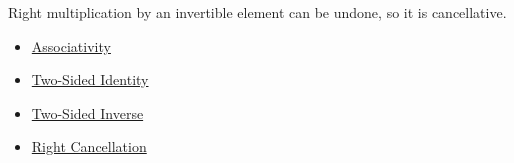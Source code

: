\begin{remark*}[Interpretation]
Right multiplication by an invertible element can be undone, so it is
cancellative.
\end{remark*}

\begin{dependencies}
\begin{itemize}
  \item \hyperref[def:associativity]{Associativity}
  \item \hyperref[def:two-sided-identity]{Two-Sided Identity}
  \item \hyperref[def:two-sided-inverse]{Two-Sided Inverse}
  \item \hyperref[def:right-cancellation]{Right Cancellation}
\end{itemize}
\end{dependencies}
